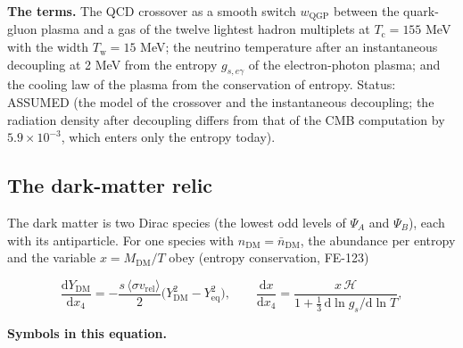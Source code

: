 \documentclass[
  10pt,
]{article}
\begin{document}
\textbf{The terms.} The QCD crossover as a smooth switch
\(w_{\mathrm{QGP}}\) between the quark-gluon plasma and a gas of the
twelve lightest hadron multiplets at \(T_{\mathrm{c}} = 155\) MeV with
the width \(T_{\mathrm{w}} = 15\) MeV; the neutrino temperature after an
instantaneous decoupling at 2 MeV from the entropy \(g_{s,e\gamma}\) of
the electron-photon plasma; and the cooling law of the plasma from the
conservation of entropy. Status: ASSUMED (the model of the crossover and
the instantaneous decoupling; the radiation density after decoupling
differs from that of the CMB computation by \(5.9\times10^{-3}\), which
enters only the entropy today).

\hypertarget{the-dark-matter-relic}{%
\subsection{The dark-matter relic}\label{the-dark-matter-relic}}

The dark matter is two Dirac species (the lowest odd levels of
\(\Psi_A\) and \(\Psi_B\)), each with its antiparticle. For one species
with \(n_{\mathrm{DM}} = \bar n_{\mathrm{DM}}\), the abundance per
entropy and the variable \(x = M_{\mathrm{DM}}/T\) obey (entropy
conservation, FE-123)

\[
\frac{\mathrm{d}Y_{\mathrm{DM}}}{\mathrm{d}x_4} = -\frac{s\,\langle\sigma v_{\mathrm{rel}}\rangle}{2}\big(Y_{\mathrm{DM}}^2 - Y_{\mathrm{eq}}^2\big),\qquad
\frac{\mathrm{d}x}{\mathrm{d}x_4} = \frac{x\,\mathcal{H}}{1 + \frac13\,\mathrm{d}\ln g_s/\mathrm{d}\ln T},
\]

\textbf{Symbols in this equation.}
\end{document}
